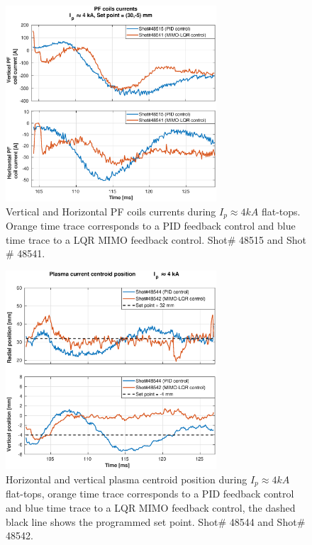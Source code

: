 \begin{figure}
	\centering
	\includegraphics[width=0.7\textwidth]{Chp5/PIDvsMIMO_515_541_curr_2.eps}
	\caption{   Vertical and Horizontal PF coils currents during  $I_p\approx 4kA$  flat-tops. Orange time trace corresponds to a PID feedback control and blue time trace to a LQR MIMO feedback control. Shot$\#$ 48515 and Shot$\#$ 48541.}
\end{figure}

\begin{figure}
	\centering
	\includegraphics[width=0.7\textwidth]{Chp5/PIDvsMIMO_544_542_2.eps}
	\caption{Horizontal and vertical plasma centroid position during  $I_p\approx 4kA$  flat-tops, orange time trace corresponds to a PID feedback control and blue time trace to a LQR MIMO feedback control, the dashed black line shows the programmed set point.   Shot$\#$ 48544 and Shot$\#$ 48542.}
\end{figure}

